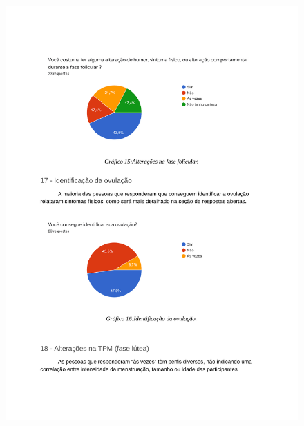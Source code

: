 \begin{apendicesenv}
        \begin{figure}[ht]
            \centering
            \includegraphics[keepaspectratio=true,scale=0.7]{figuras/Tab13.pdf}
        \end{figure}
        

\end{apendicesenv}
